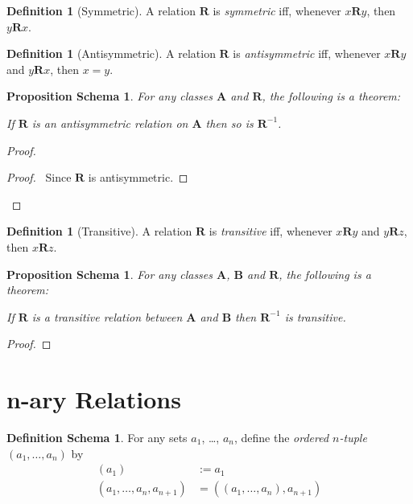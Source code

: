 \documentclass{book}
\let\qed\relax
\newtheorem{props}[ax]{Proposition Schema}
\theoremstyle{definition}
\newtheorem{df}[ax]{Definition}
\newtheorem{dfs}[ax]{Definition Schema}
\begin{document}
\begin{df}[Symmetric]
A relation $\mathbf{R}$ is \emph{symmetric} iff, whenever $x\mathbf{R}y$, then $y\mathbf{R}x$.
\end{df}

\begin{df}[Antisymmetric]
A relation $\mathbf{R}$ is \emph{antisymmetric} iff, whenever $x \mathbf{R} y$ and $y \mathbf{R} x$, then $x = y$.
\end{df}

\begin{props}
\label{prop:invantisym}
For any classes $\mathbf{A}$ and $\mathbf{R}$, the following is a theorem:

If $\mathbf{R}$ is an antisymmetric relation on $\mathbf{A}$ then so is $\mathbf{R}^{-1}$.
\end{props}

\begin{proof}
\pf
{}
\begin{proof}
	\pf\ Since $\mathbf{R}$ is antisymmetric.
\end{proof}
\qed
\end{proof}

\begin{df}[Transitive]
A relation $\mathbf{R}$ is \emph{transitive} iff, whenever $x\mathbf{R}y$ and $y \mathbf{R} z$, then $x\mathbf{R} z$.
\end{df}

\begin{props}
\label{prop:invtrans}
For any classes $\mathbf{A}$, $\mathbf{B}$ and $\mathbf{R}$, the following is a theorem:

If $\mathbf{R}$ is a transitive relation between $\mathbf{A}$ and $\mathbf{B}$ then $\mathbf{R}^{-1}$ is transitive.
\end{props}

\begin{proof}
\pf
{}
\qed
\end{proof}

\section{n-ary Relations}

\begin{dfs}
For any sets $a_1$, \ldots, $a_n$, define the \emph{ordered $n$-tuple} $(a_1, \ldots, a_n)$ by
\begin{align*}
(a_1) & := a_1 \\
(a_1, \ldots, a_n, a_{n+1}) & = ((a_1, \ldots, a_n), a_{n+1})
\end{align*}
\end{dfs}
\end{document}
